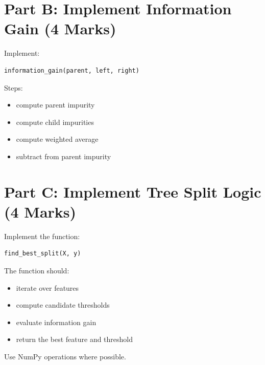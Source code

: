 \documentclass[12pt,a4paper]{article}
\begin{document}

\section{Part B: Implement Information Gain (4 Marks)}

\begin{tcolorbox}

Implement:

\begin{verbatim}
information_gain(parent, left, right)
\end{verbatim}

Steps:

\begin{itemize}
\item compute parent impurity
\item compute child impurities
\item compute weighted average
\item subtract from parent impurity
\end{itemize}

\vspace{5cm}

\end{tcolorbox}


\section{Part C: Implement Tree Split Logic (4 Marks)}

\begin{tcolorbox}

Implement the function:

\begin{verbatim}
find_best_split(X, y)
\end{verbatim}

The function should:

\begin{itemize}
\item iterate over features
\item compute candidate thresholds
\item evaluate information gain
\item return the best feature and threshold
\end{itemize}

Use NumPy operations where possible.

\vspace{6cm}

\end{tcolorbox}
\end{document}
